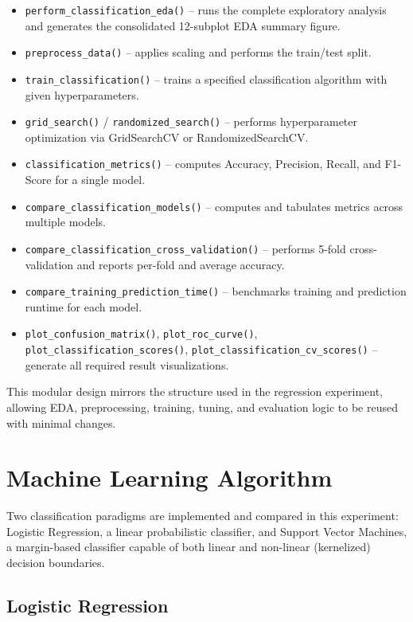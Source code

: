 \documentclass[12pt,a4paper]{article}
\begin{document}
\begin{itemize}
\item \texttt{perform\_classification\_eda()} -- runs the complete exploratory analysis and generates the consolidated 12-subplot EDA summary figure.
\item \texttt{preprocess\_data()} -- applies scaling and performs the train/test split.
\item \texttt{train\_classification()} -- trains a specified classification algorithm with given hyperparameters.
\item \texttt{grid\_search()} / \texttt{randomized\_search()} -- performs hyperparameter optimization via GridSearchCV or RandomizedSearchCV.
\item \texttt{classification\_metrics()} -- computes Accuracy, Precision, Recall, and F1-Score for a single model.
\item \texttt{compare\_classification\_models()} -- computes and tabulates metrics across multiple models.
\item \texttt{compare\_classification\_cross\_validation()} -- performs 5-fold cross-validation and reports per-fold and average accuracy.
\item \texttt{compare\_training\_prediction\_time()} -- benchmarks training and prediction runtime for each model.
\item \texttt{plot\_confusion\_matrix()}, \texttt{plot\_roc\_curve()}, \texttt{plot\_classification\_scores()}, \texttt{plot\_classification\_cv\_scores()} -- generate all required result visualizations.
\end{itemize}

This modular design mirrors the structure used in the regression experiment, allowing EDA, preprocessing, training, tuning, and evaluation logic to be reused with minimal changes.

\section{Machine Learning Algorithm}

Two classification paradigms are implemented and compared in this experiment: Logistic Regression, a linear probabilistic classifier, and Support Vector Machines, a margin-based classifier capable of both linear and non-linear (kernelized) decision boundaries.

\subsection{Logistic Regression}
\end{document}

